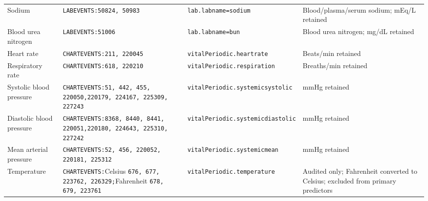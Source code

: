 \documentclass[utf8]{FrontiersinHarvard} %
\begin{document}
\begin{table}[h]
\begin{tabular}{>{\raggedright\arraybackslash}p{}>{\raggedright\arraybackslash}p{}>{\raggedright\arraybackslash}p{}>{\raggedright\arraybackslash}p{}}
		Sodium & \texttt{LABEVENTS:}\newline \texttt{50824, 50983} & \texttt{lab.labname=}\newline \texttt{sodium} & Blood/plasma/serum sodium; mEq/L retained \\
		Blood urea nitrogen & \texttt{LABEVENTS:}\newline \texttt{51006} & \texttt{lab.labname=}\newline \texttt{bun} & Blood urea nitrogen; mg/dL retained \\
		Heart rate & \texttt{CHARTEVENTS:}\newline \texttt{211, 220045} & \texttt{vitalPeriodic.}\newline \texttt{heartrate} & Beats/min retained \\
		Respiratory rate & \texttt{CHARTEVENTS:}\newline \texttt{618, 220210} & \texttt{vitalPeriodic.}\newline \texttt{respiration} & Breaths/min retained \\
		Systolic blood pressure & \texttt{CHARTEVENTS:}\newline \texttt{51, 442, 455, 220050,}\newline \texttt{220179, 224167, 225309, 227243} & \texttt{vitalPeriodic.}\newline \texttt{systemicsystolic} & mmHg retained \\
		Diastolic blood pressure & \texttt{CHARTEVENTS:}\newline \texttt{8368, 8440, 8441, 220051,}\newline \texttt{220180, 224643, 225310, 227242} & \texttt{vitalPeriodic.}\newline \texttt{systemicdiastolic} & mmHg retained \\
		Mean arterial pressure & \texttt{CHARTEVENTS:}\newline \texttt{52, 456, 220052, 220181, 225312} & \texttt{vitalPeriodic.}\newline \texttt{systemicmean} & mmHg retained \\
		Temperature & \texttt{CHARTEVENTS:}\newline Celsius \texttt{676, 677, 223762, 226329;}\newline Fahrenheit \texttt{678, 679, 223761} & \texttt{vitalPeriodic.}\newline \texttt{temperature} & Audited only; Fahrenheit converted to Celsius; excluded from primary predictors \\ \hline
	\end{tabular}
\end{table}
\end{document}
